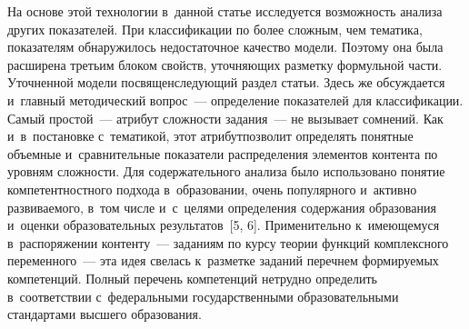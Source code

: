 \begin{multicols}{2}
     
     На основе этой технологии в~данной статье исследуется возможность 
анализа других показателей. При классификации по более сложным, чем 
тематика, показателям обнаружилось недостаточное качество модели. 
Поэтому она была расширена третьим блоком свойств, уточняющих разметку 
формульной части. Уточненной модели посвящен\linebreak следующий раздел статьи. 
Здесь же обсуждается и~главный методический вопрос~--- определение 
показателей для классификации. Самый \mbox{простой}~--- атрибут слож\-ности 
задания~--- не вызывает сомнений. Как и~в~постановке с~тематикой, этот 
атрибут\linebreak позволит определять понятные объемные и~сравнительные 
показатели распределения элементов контента по уровням слож\-ности. Для 
содержательного анализа было использовано понятие \mbox{компетентностного} 
подхода в~образовании, очень популярного и~активно развиваемого, в~том 
чис\-ле и~с~целями определения содержания образования и~оцен\-ки 
образовательных результатов~[5, 6]. Применительно к~имеющемуся 
в~распоряжении контенту~--- заданиям по курсу тео\-рии функций 
комплексного переменного~--- эта идея свелась к~разметке заданий перечнем 
фор\-ми\-ру\-емых компетенций. Полный перечень компетенций не\-труд\-но 
определить в~соответствии с~федеральными государственными 
образовательными стандартами высшего образования.

\begin{figure*} %
 \vspace*{1pt}
\begin{center}
   \mbox{%
\epsfxsize=162.491mm 
}
\end{center}
\vspace*{-9pt}
\end{figure*}
     

\end{multicols}
